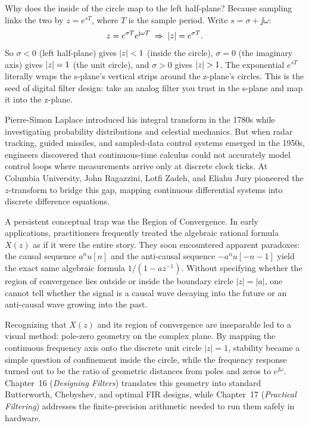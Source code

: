 \begin{whybox}
Why does the inside of the circle map to the left half-plane? Because sampling links the
two by $z = e^{sT}$, where $T$ is the sample period. Write $s=\sigma+\jj\omega$:
\[
  z = e^{\sigma T} e^{\mathrm{j}\omega T} \;\Rightarrow\; \lvert z\rvert=e^{\sigma T}.
\]
So $\sigma<0$ (left half-plane) gives $\lvert z\rvert<1$ (inside the circle), $\sigma=0$ (the
imaginary axis) gives $\lvert z\rvert=1$ (the unit circle), and $\sigma>0$ gives $\lvert z\rvert>1$. The
exponential $e^{sT}$ literally wraps the s-plane's vertical strips around the z-plane's
circles. This is the seed of digital filter design: take an analog filter you trust in the
s-plane and map it into the z-plane.
\end{whybox}

\begin{historybox}
Pierre-Simon Laplace introduced his integral transform in the 1780s while investigating
probability distributions and celestial mechanics. But when radar tracking, guided missiles,
and sampled-data control systems emerged in the 1950s, engineers discovered that continuous-time
calculus could not accurately model control loops where measurements arrive only at discrete clock ticks.
At Columbia University, John Ragazzini, Lotfi Zadeh, and Eliahu Jury pioneered the $z$-transform to
bridge this gap, mapping continuous differential systems into discrete difference equations.

A persistent conceptual trap was the Region of Convergence. In early applications, practitioners
frequently treated the algebraic rational formula $X(z)$ as if it were the entire story. They soon
encountered apparent paradoxes: the causal sequence $a^n u[n]$ and the anti-causal sequence
$-a^n u[-n-1]$ yield the exact same algebraic formula $1/(1 - a z^{-1})$. Without specifying
whether the region of convergence lies outside or inside the boundary circle $|z|=|a|$, one cannot
tell whether the signal is a causal wave decaying into the future or an anti-causal wave growing
into the past.

Recognizing that $X(z)$ and its region of convergence are inseparable led to a visual method:
pole-zero geometry on the complex plane. By mapping the continuous frequency axis onto the discrete
unit circle $|z|=1$, stability became a simple question of confinement inside the circle, while the
frequency response turned out to be the ratio of geometric distances from poles and zeros to $e^{\jj\omega}$.
Chapter~16 (\emph{Designing Filters}) translates this geometry into standard Butterworth, Chebyshev,
and optimal FIR designs, while Chapter~17 (\emph{Practical Filtering}) addresses the finite-precision
arithmetic needed to run them safely in hardware.
\end{historybox}

